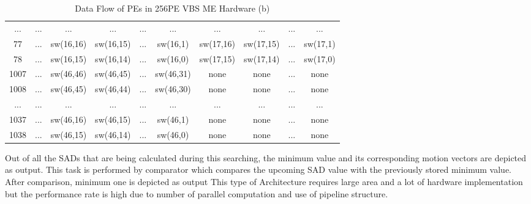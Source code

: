\begin{table}[H]
\begin{tabular}{|c|c|c|c|c|c|c|c|c|c|}
		... & ... & ... & ... & ... & ... & ... & ... & ... & ... \\
		
		77 & ... & sw(16,16) & sw(16,15) & ... & sw(16,1) & sw(17,16) & sw(17,15) & ... & sw(17,1) \\
		
		78 & ... & sw(16,15) & sw(16,14) & ... & sw(16,0) & sw(17,15) & sw(17,14) & ... & sw(17,0)  \\
		
		\hline
		
		1007 & ... & sw(46,46) & sw(46,45) & ... & sw(46,31) & none & none & ... & none \\
		
		1008 & ... & sw(46,45) & sw(46,44) & ... & sw(46,30) & none & none & ... & none \\
		
		... & ... & ... & ... & ... & ... & ... & ... & ... & ... \\
		
		1037 & ... & sw(46,16) & sw(46,15) & ... & sw(46,1) & none & none & ... & none \\
		
		1038 & ... & sw(46,15) & sw(46,14) & ... & sw(46,0) & none & none & ... & none  \\
		
		\hline
	\end{tabular}
	\caption{ Data Flow of PEs in 256PE VBS ME Hardware (b)}
	\label{tab:dataflow2}
\end{table}

 Out of all the SADs that are being calculated during this searching, the minimum value and its corresponding motion vectors are depicted as output. This task is performed by comparator which compares the upcoming SAD value with the previously stored minimum value. After comparison, minimum one is depicted as output This type of Architecture requires large area and a lot of hardware implementation but the performance rate is high due to number of parallel computation and use of pipeline structure.